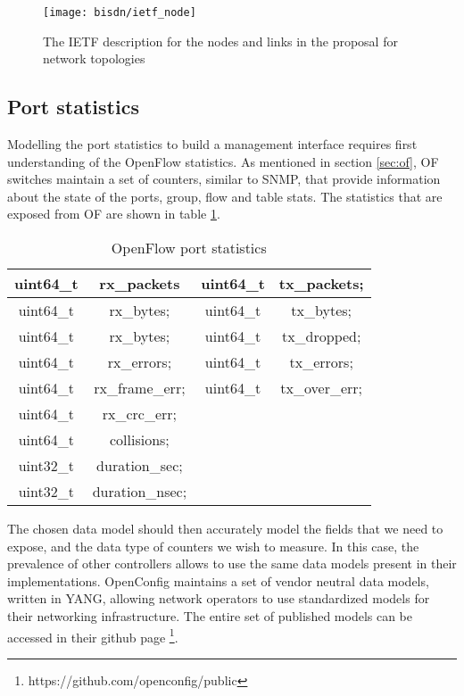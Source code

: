 \begin{figure} [h]
    \centering
    \texttt{[image: bisdn/ietf\_node]}
    \caption{The IETF description for the nodes and links in the proposal for network topologies \cite{clemm_data_2017}}
    \label{fig:ietf_topology}
\end{figure}

\subsection {Port statistics}

\par Modelling the port statistics to build a management interface requires first understanding of the OpenFlow statistics. As mentioned in section \ref{sec:of}, OF
switches maintain a set of counters, similar to SNMP, that provide information about the state of the ports, group, flow and table stats. The statistics that are
exposed from OF are shown in table \ref{tab:of_port_stats}.

\begin{table}[H]
    \centering
    \caption{OpenFlow port statistics}
    \begin{tabular}{c | c || c | c}
       uint64\_t & rx\_packets     & uint64\_t & tx\_packets;     \\ \hline
       uint64\_t & rx\_bytes;      & uint64\_t & tx\_bytes;       \\ \hline
       uint64\_t & rx\_bytes;      & uint64\_t & tx\_dropped;     \\ \hline
       uint64\_t & rx\_errors;     & uint64\_t & tx\_errors;      \\ \hline
       uint64\_t & rx\_frame\_err; & uint64\_t & tx\_over\_err;   \\ \hline
       uint64\_t & rx\_crc\_err;   &                              \\ \hline
       uint64\_t & collisions;     &                              \\ \hline
       uint32\_t & duration\_sec;  &                              \\ \hline
       uint32\_t & duration\_nsec; &                 
    \label{tab:of_port_stats}
    \end{tabular}
\end{table}

\par The chosen data model should then accurately model the fields that we need to expose, and the data type of counters we wish to measure. In this case,
the prevalence of other controllers allows to use the same data models present in their implementations. OpenConfig maintains a set of vendor neutral data models,
written in YANG, allowing network operators to use standardized models for their networking infrastructure. The entire set of published models can be accessed in
their github page \footnote {https://github.com/openconfig/public}.

